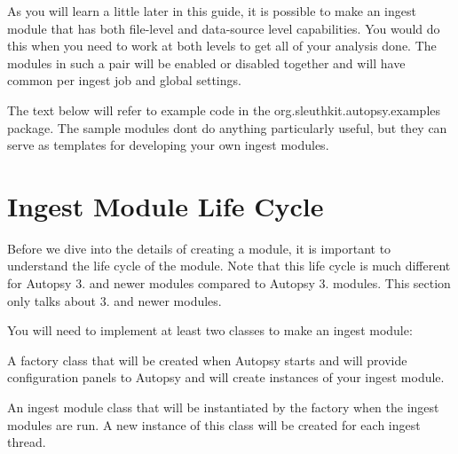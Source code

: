 As you will learn a little later in this guide, it is possible to make an ingest module that has both file-\/level and data-\/source level capabilities. You would do this when you need to work at both levels to get all of your analysis done. The modules in such a pair will be enabled or disabled together and will have common per ingest job and global settings.

The text below will refer to example code in the org.\+sleuthkit.\+autopsy.\+examples package. The sample modules don\textquotesingle{}t do anything particularly useful, but they can serve as templates for developing your own ingest modules.\hypertarget{mod_ingest_page_ingest_modules_lifecycle}{}\section{Ingest Module Life Cycle}\label{mod_ingest_page_ingest_modules_lifecycle}
Before we dive into the details of creating a module, it is important to understand the life cycle of the module. Note that this life cycle is much different for Autopsy 3. and newer modules compared to Autopsy 3. modules. This section only talks about 3. and newer modules.

You will need to implement at least two classes to make an ingest module\+:
\begin{DoxyEnumerate}
\item A factory class that will be created when Autopsy starts and will provide configuration panels to Autopsy and will create instances of your ingest module.
\item An ingest module class that will be instantiated by the factory when the ingest modules are run. A new instance of this class will be created for each ingest thread.
\end{DoxyEnumerate}

